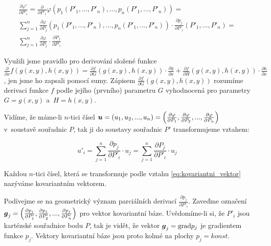 \begin{equation}
\begin{split}
\frac{\partial \varphi'}{\partial P'_i} = \frac{\partial}{\partial P'_i} \varphi (p_1(P'_1, ..., P'_n), ..., p_n(P'_1, ..., P'_n)) = \\
\sum_{j=1}^n \frac{\partial \varphi}{\partial P_j} (p_1(P'_1, ..., P'_n), ..., p_n(P'_1, ..., P'_n)) \cdot \frac{\partial p_j}{\partial P'_i} (P'_1, ..., P'_n) = \\
\sum_{j=1}^n \frac{\partial \varphi}{\partial P_j} \cdot \frac{\partial P_j}{\partial P'_i}
\end{split}
\end{equation}

Využili jsme pravidlo pro derivování složené funkce \(\frac{\partial}{\partial x} f(g(x, y), h(x, y)) = \frac{\partial f}{\partial G}(g(x, y), h(x, y)) \cdot \frac{\partial g}{\partial x} + \frac{\partial f}{\partial H}(g(x, y), h(x, y)) \cdot \frac{\partial h}{\partial x}\), jen jsme ho zapsali pomocí sumy. Zápisem \(\frac{\partial f}{\partial G}(g(x, y), h(x, y))\) rozumíme derivaci funkce \(f\) podle jejího (prvního) parametru \(G\) vyhodnocená pro parametry \(G = g(x, y)\) a~\(H = h(x, y)\).

Vidíme, že máme-li \(n\)-tici čísel \(\boldsymbol{u} = (u_1, u_2, ..., u_n) = \left( \frac{\partial \varphi}{\partial P_1}, \frac{\partial \varphi}{\partial P_2}, ..., \frac{\partial \varphi}{\partial P_n} \right)\) v~soustavě souřadnic \(P\), tak ji do soustavy souřadnic \(P'\) transformujeme vztahem:

\begin{equation}
\label{eq:kovariantni_vektor}
u'_i = \sum_{j=1}^n \frac{\partial p_j}{\partial P'_i} \cdot u_j = \sum_{j=1}^n \frac{\partial P_j}{\partial P'_i} \cdot u_j
\end{equation}

Každou \(n\)-tici čísel, která se transformuje podle vztahu \eqref{eq:kovariantni_vektor} nazýváme kovariantním vektorem.

Podívejme se na geometrický význam parciálních derivací \(\frac{\partial p_j}{\partial P'_i}\). Zaveďme označení \(\boldsymbol{g}_j = \left(\frac{\partial p_j}{\partial P'_1}, \frac{\partial p_j}{\partial P'_2}, ..., \frac{\partial p_j}{\partial P'_n}\right)\) pro vektor kovariantní báze. Uvědomíme-li si, že \(P'_i\) jsou kartézské souřadnice bodu \(P\), tak je vidět, že vektor \(\boldsymbol{g}_j = \mathrm{grad} p_j\) je gradientem funkce \(p_j\). Vektory kovariantní báze jsou proto kolmé na plochy \(p_j = konst\).

